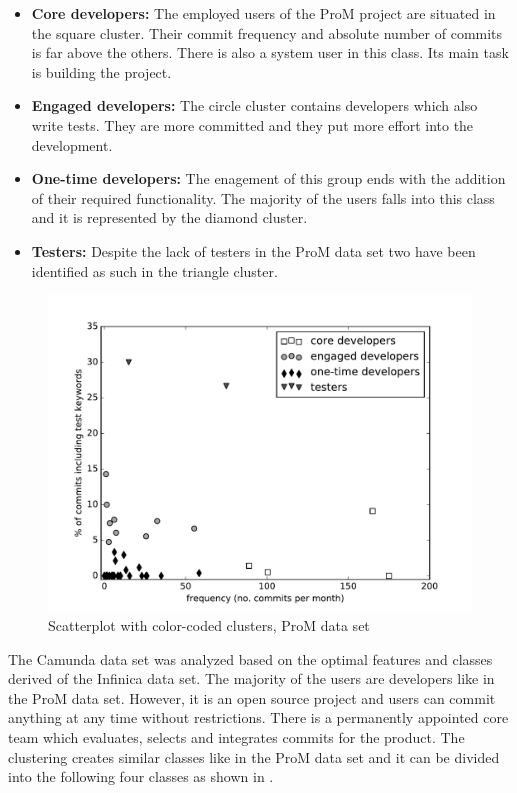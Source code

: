 \begin{itemize}
\item \textbf{Core developers:} The employed users of the ProM project are situated in the square cluster. Their commit frequency and absolute number of commits is far above the others. There is also a system user in this class. Its main task is building the project.

\item \textbf{Engaged developers:} The circle cluster contains developers which also write tests. They are more committed and they put more effort into the development.

\item \textbf{One-time developers:} The enagement of this group ends with the addition of their required functionality. The majority of the users falls into this class and it is represented by the diamond cluster.

\item \textbf{Testers:} Despite the lack of testers in the ProM data set two have been identified as such in the triangle cluster.
\end{itemize}


\begin{figure}
   \includegraphics[width=\columnwidth]{ResourceClassification/figures/prom4k_black.pdf}
   \caption{Scatterplot with color-coded clusters, ProM data set}
   \label{fig:prom4k}
\end{figure}


The Camunda data set was analyzed based on the optimal features and classes derived of the Infinica data set. The majority of the users are developers like in the ProM data set. However, it is an open source project and users can commit anything at any time without restrictions. There is a permanently appointed core team which evaluates, selects and integrates commits for the product. The clustering creates similar classes like in the ProM data set and it can be divided into the following four classes as shown in .


